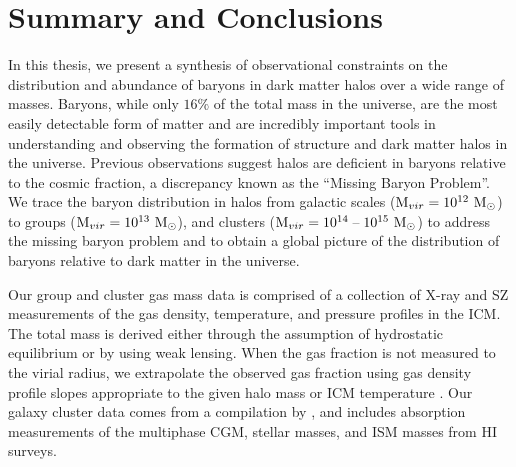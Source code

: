 \chapter{Summary and Conclusions}
\label{chap:Conclusions}

In this thesis, we present a synthesis of observational constraints on
the distribution and abundance of baryons in dark matter halos over a
wide range of masses. Baryons, while only $16\%$ of the total mass in
the universe, are the most easily detectable form of matter and are
incredibly important tools in understanding and observing the
formation of structure and dark matter halos in the universe. Previous
observations suggest halos are deficient in baryons relative to the
cosmic fraction, a discrepancy known as the ``Missing Baryon
Problem''. We trace the baryon distribution in halos from galactic
scales ($\textrm{M\ensuremath{_{vir}}}{} = 10^{12}~\textrm{M}_\odot$) to groups ($\textrm{M\ensuremath{_{vir}}}{}=10^{13}~\textrm{M}_\odot$),
and clusters ($\textrm{M\ensuremath{_{vir}}}{} = 10^{14}\;\textrm{--}\;10^{15}~\textrm{M}_\odot$) to address the missing
baryon problem and to obtain a global picture of the distribution of
baryons relative to dark matter in the universe. 

Our group and cluster gas mass data is comprised of a collection of
X-ray and SZ measurements of the gas density, temperature, and
pressure profiles in the ICM. The total mass is derived either through
the assumption of hydrostatic equilibrium or by using weak
lensing. When the gas fraction is not measured to the virial radius,
we extrapolate the observed gas fraction using gas density profile
slopes appropriate to the given halo mass or ICM temperature
\citep{Rasheed2011}. Our galaxy cluster data comes from a compilation
by \citet{Werk2014}, and includes absorption measurements of the
multiphase CGM, stellar masses, and ISM masses from HI surveys.

